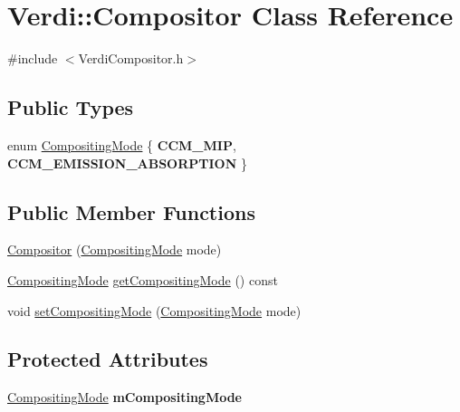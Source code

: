 \hypertarget{class_verdi_1_1_compositor}{\section{\-Verdi\-:\-:\-Compositor \-Class \-Reference}
\label{class_verdi_1_1_compositor}
}


{\ttfamily \#include $<$\-Verdi\-Compositor.\-h$>$}

\subsection*{\-Public \-Types}
\begin{DoxyCompactItemize}
\item 
enum \hyperlink{class_verdi_1_1_compositor_a3cb972b9bee3af1bf6a9e1a61e11d63e}{\-Compositing\-Mode} \{ {\bfseries \-C\-C\-M\-\_\-\-M\-I\-P}, 
{\bfseries \-C\-C\-M\-\_\-\-E\-M\-I\-S\-S\-I\-O\-N\-\_\-\-A\-B\-S\-O\-R\-P\-T\-I\-O\-N}
 \}
\end{DoxyCompactItemize}
\subsection*{\-Public \-Member \-Functions}
\begin{DoxyCompactItemize}
\item 
\hyperlink{class_verdi_1_1_compositor_ab89c9658ebf335b9b3a0aa2a6639de65}{\-Compositor} (\hyperlink{class_verdi_1_1_compositor_a3cb972b9bee3af1bf6a9e1a61e11d63e}{\-Compositing\-Mode} mode)
\item 
\hyperlink{class_verdi_1_1_compositor_a3cb972b9bee3af1bf6a9e1a61e11d63e}{\-Compositing\-Mode} \hyperlink{class_verdi_1_1_compositor_a225aa1ecd1aa4d789102e1686b9fe05e}{get\-Compositing\-Mode} () const 
\item 
void \hyperlink{class_verdi_1_1_compositor_ab271f77dd5ae5f1dc8c2ee19c28bf124}{set\-Compositing\-Mode} (\hyperlink{class_verdi_1_1_compositor_a3cb972b9bee3af1bf6a9e1a61e11d63e}{\-Compositing\-Mode} mode)
\end{DoxyCompactItemize}
\subsection*{\-Protected \-Attributes}
\begin{DoxyCompactItemize}
\item 
\hypertarget{class_verdi_1_1_compositor_ab4c7198e259a6b80d1fa88248aa9d4f7}{\hyperlink{class_verdi_1_1_compositor_a3cb972b9bee3af1bf6a9e1a61e11d63e}{\-Compositing\-Mode} {\bfseries m\-Compositing\-Mode}}\label{class_verdi_1_1_compositor_ab4c7198e259a6b80d1fa88248aa9d4f7}

\end{DoxyCompactItemize}


